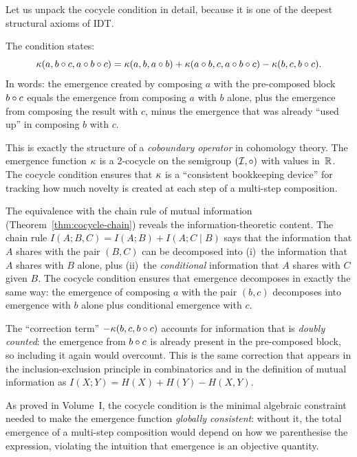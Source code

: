\begin{remark}
Let us unpack the cocycle condition in detail, because it is
one of the deepest structural axioms of IDT.

The condition states:
\[
  \kappa(a, b \circ c, a \circ b \circ c)
  = \kappa(a, b, a \circ b)
  + \kappa(a \circ b, c, a \circ b \circ c)
  - \kappa(b, c, b \circ c).
\]
In words: the emergence created by composing $a$ with the pre-composed
block $b \circ c$ equals the emergence from composing $a$ with $b$
alone, plus the emergence from composing the result with $c$, minus the
emergence that was already ``used up'' in composing $b$ with $c$.

This is exactly the structure of a \emph{coboundary operator} in
cohomology theory.  The emergence function $\kappa$ is a 2-cocycle on
the semigroup $(\mathcal{I}, \circ)$ with values in~$\mathbb{R}$.  The cocycle
condition ensures that $\kappa$ is a ``consistent bookkeeping device''
for tracking how much novelty is created at each step of a multi-step
composition.

The equivalence with the chain rule of mutual information
(Theorem~\ref{thm:cocycle-chain}) reveals the information-theoretic
content.  The chain rule $I(A; B, C) = I(A; B) + I(A; C \mid B)$ says
that the information that $A$ shares with the pair $(B, C)$ can be
decomposed into (i)~the information that $A$ shares with $B$ alone,
plus (ii)~the \emph{conditional} information that $A$ shares with $C$
given $B$.  The cocycle condition ensures that emergence decomposes
in exactly the same way: the emergence of composing $a$ with the
pair $(b, c)$ decomposes into emergence with $b$ alone plus conditional
emergence with $c$.

The ``correction term'' $-\kappa(b, c, b \circ c)$ accounts for
information that is \emph{doubly counted}: the emergence from
$b \circ c$ is already present in the pre-composed block, so
including it again would overcount.  This is the same correction
that appears in the inclusion-exclusion principle in combinatorics
and in the definition of mutual information as
$I(X; Y) = H(X) + H(Y) - H(X, Y)$.

As proved in Volume~I, the cocycle condition is the minimal algebraic
constraint needed to make the emergence function \emph{globally
consistent}: without it, the total emergence of a multi-step
composition would depend on how we parenthesise the expression,
violating the intuition that emergence is an objective quantity.
\end{remark}

